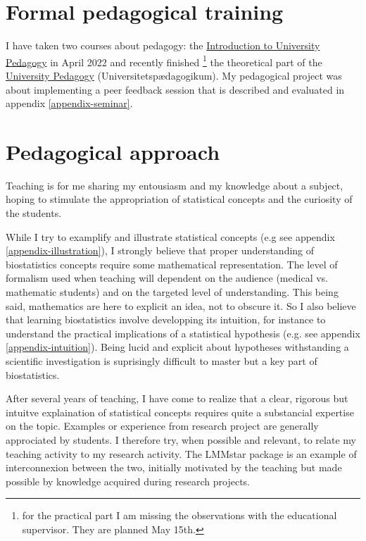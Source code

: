 \documentclass[12pt]{article}
\begin{document}
\clearpage


\section{Formal pedagogical training}
\label{sec:orgb9acea9}

I have taken two courses about pedagogy: the \href{https://absalon.ku.dk/courses/58829}{Introduction to
University Pedagogy} in April 2022 and recently finished \footnote{for the
practical part I am missing the observations with the educational
supervisor. They are planned May 15th.} the theoretical part of the
\href{https://absalon.ku.dk/courses/58114}{University Pedagogy} (Universitetspædagogikum). My pedagogical project
was about implementing a peer feedback session that is described and
evaluated in appendix \ref{appendix-seminar}.

\section{Pedagogical approach}
\label{sec:org7a32d0a}

Teaching is for me sharing my entousiasm and my knowledge about a
subject, hoping to stimulate the appropriation of statistical concepts
and the curiosity of the students.

\bigskip

While I try to examplify and illustrate statistical concepts (e.g see
appendix \ref{appendix-illustration}), I strongly believe that proper
understanding of biostatistics concepts require some mathematical
representation. The level of formalism used when teaching will
dependent on the audience (medical vs. mathematic students) and on the
targeted level of understanding. This being said, mathematics are here
to explicit an idea, not to obscure it. So I also believe that
learning biostatistics involve developping its intuition, for instance
to understand the practical implications of a statistical hypothesis
(e.g. see appendix \ref{appendix-intuition}). Being lucid and explicit
about hypotheses withstanding a scientific investigation is
suprisingly difficult to master but a key part of biostatistics.

\bigskip

After several years of teaching, I have come to realize that a clear,
rigorous but intuitve explaination of statistical concepts requires
quite a substancial expertise on the topic. Examples or experience
from research project are generally approciated by students. I
therefore try, when possible and relevant, to relate my teaching
activity to my research activity. The LMMstar package is an example of
interconnexion between the two, initially motivated by the teaching
but made possible by knowledge acquired during research projects.
\end{document}

